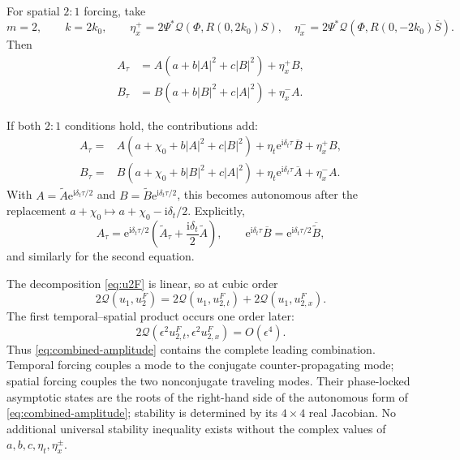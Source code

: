 \documentclass[11pt]{article}
\newcommand{\ii}{\mathrm{i}}
\newcommand{\ee}{\mathrm{e}}
\newcommand{\cQ}{\mathcal{Q}}
\begin{document}
For spatial $2{:}1$ forcing, take
\begin{equation}
 m=2,
 \qquad k=2k_0,
 \qquad
 \eta_x^+=2\Psi^*\cQ(\Phi,R(0,2k_0)S),
 \quad
 \eta_x^-=2\Psi^*\cQ(\Phi,R(0,-2k_0)\overline S).
 \label{eq:spatial-coefficients}
\end{equation}
Then
\begin{subequations}
\label{eq:spatial-amplitude}
\begin{align}
 A_\tau&=A(a+b|A|^2+c|B|^2)+\eta_x^+B,\\
 B_\tau&=B(a+b|B|^2+c|A|^2)+\eta_x^-A.
\end{align}
\end{subequations}

If both $2{:}1$ conditions hold, the contributions add:
\begin{subequations}
\label{eq:combined-amplitude}
\begin{align}
 A_\tau={}&A(a+\chi_0+b|A|^2+c|B|^2)
 +\eta_t\ee^{\ii\delta_t\tau}\overline B+\eta_x^+B,
 \label{eq:combined-A}\\
 B_\tau={}&B(a+\chi_0+b|B|^2+c|A|^2)
 +\eta_t\ee^{\ii\delta_t\tau}\overline A+\eta_x^-A.
 \label{eq:combined-B}
\end{align}
\end{subequations}
With $A=\widetilde A\ee^{\ii\delta_t\tau/2}$ and
$B=\widetilde B\ee^{\ii\delta_t\tau/2}$, this becomes autonomous after the
replacement $a+\chi_0\mapsto a+\chi_0-\ii\delta_t/2$.  Explicitly,
\begin{equation}
 A_\tau=\ee^{\ii\delta_t\tau/2}
 \left(\widetilde A_\tau+\frac{\ii\delta_t}{2}\widetilde A\right),
 \qquad
 \ee^{\ii\delta_t\tau}\overline B
 =\ee^{\ii\delta_t\tau/2}\overline{\widetilde B},
\end{equation}
and similarly for the second equation.

The decomposition \eqref{eq:u2F} is linear, so at cubic order
\begin{equation}
 2\cQ(u_1,u_2^F)
 =2\cQ(u_1,u_{2,t}^F)+2\cQ(u_1,u_{2,x}^F).
 \label{eq:forcing-additivity}
\end{equation}
The first temporal--spatial product occurs one order later:
\begin{equation}
 2\cQ(\epsilon^2u_{2,t}^F,\epsilon^2u_{2,x}^F)
 =O(\epsilon^4).
 \label{eq:no-forcing-cross-term}
\end{equation}
Thus \eqref{eq:combined-amplitude} contains the complete leading combination.
Temporal forcing couples a mode to the conjugate counter-propagating mode;
spatial forcing couples the two nonconjugate traveling modes.  Their
phase-locked asymptotic states are the roots of the right-hand side of the
autonomous form of \eqref{eq:combined-amplitude}; stability is determined by
its $4\times4$ real Jacobian.  No additional universal stability inequality
exists without the complex values of $a,b,c,\eta_t,\eta_x^\pm$.
\end{document}
